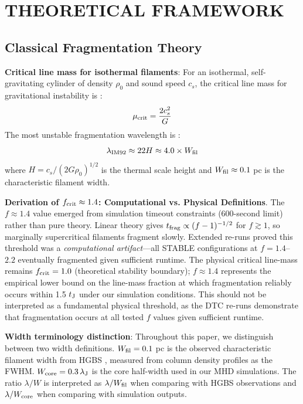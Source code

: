 \documentclass[twocolumn,longtitle,usenatbib]{mnras}
\begin{document}
\section{THEORETICAL FRAMEWORK}

\subsection{Classical Fragmentation Theory}

\textbf{Critical line mass for isothermal filaments}: For an isothermal, self-gravitating cylinder of density $\rho_0$ and sound speed $c_s$, the critical line mass for gravitational instability is \citep{Ostriker1964}:
\begin{equation}
\mu_{\rm crit} = \frac{2c_s^2}{G}
\end{equation}
The most unstable fragmentation wavelength is \citep{Inutsuka1992}:
\begin{equation}
\lambda_{\rm IM92} \approx 22 H \approx 4.0 \times W_{\rm fil}
\label{eq:im92}
\end{equation}
where $H = c_s/(2G\rho_0)^{1/2}$ is the thermal scale height and $W_{\rm fil} \approx 0.1$ pc is the characteristic filament width.

\textbf{Derivation of $f_{\rm crit} \approx 1.4$: Computational vs. Physical Definitions}. The $f \approx 1.4$ value emerged from simulation timeout constraints (600-second limit) rather than pure theory. Linear theory gives $t_{\rm frag} \propto (f - 1)^{-1/2}$ for $f \gtrsim 1$, so marginally supercritical filaments fragment slowly. Extended re-runs proved this threshold was a \textit{computational artifact}---all STABLE configurations at $f = 1.4$--$2.2$ eventually fragmented given sufficient runtime. The physical critical line-mass remains $f_{\rm crit} = 1.0$ (theoretical stability boundary); $f \approx 1.4$ represents the empirical lower bound on the line-mass fraction at which fragmentation reliably occurs within 1.5 $t_{\rm J}$ under our simulation conditions. This should not be interpreted as a fundamental physical threshold, as the DTC re-runs demonstrate that fragmentation occurs at all tested $f$ values given sufficient runtime.

\textbf{Width terminology distinction}: Throughout this paper, we distinguish between two width definitions. $W_{\rm fil} = 0.1$ pc is the observed characteristic filament width from HGBS \citep{Arzoumanian2011}, measured from column density profiles as the FWHM. $W_{\rm core} = 0.3\,\lambda_{\rm J}$ is the core half-width used in our MHD simulations. The ratio $\lambda/W$ is interpreted as $\lambda/W_{\rm fil}$ when comparing with HGBS observations and $\lambda/W_{\rm core}$ when comparing with simulation outputs.
\end{document}

